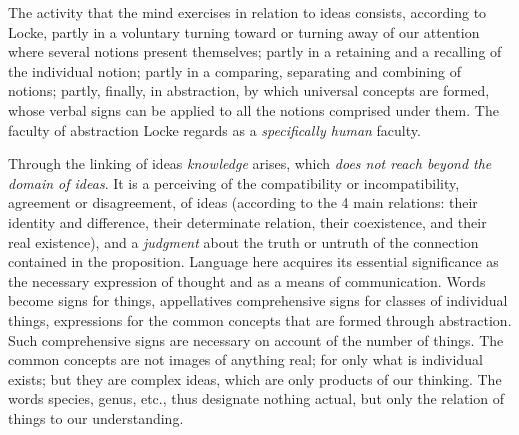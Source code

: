 The activity that the mind exercises in relation to ideas consists,
according to Locke, partly in a voluntary turning toward or turning away
of our attention where several notions present themselves; partly in a
retaining and a recalling of the individual notion; partly in a
comparing, separating and combining of notions; partly, finally, in
abstraction, by which universal concepts are formed, whose verbal signs
can be applied to all the notions comprised under them. The faculty of
abstraction Locke regards as a \emph{specifically human} faculty.

Through the linking of ideas \emph{knowledge} arises, which \emph{does
not reach beyond the domain of ideas}. It is a perceiving of the
compatibility or incompatibility, agreement or disagreement, of ideas
(according to the 4 main relations: their identity and difference,
their determinate relation, their coexistence, and their real
existence), and a \emph{judgment} about the truth or untruth of the
connection contained in the proposition. Language here acquires its
essential significance as the necessary expression of thought and as a
means of communication. Words become signs for things, appellatives
comprehensive signs for classes of individual things,
expressions for the common concepts that are formed through
abstraction. Such comprehensive signs are necessary on account of the
number of things. The common concepts are not images of anything real;
for only what is individual exists; but they are complex ideas, which
are only products of our thinking. The words species, genus, etc., thus
designate nothing actual, but only the relation of things to our
understanding.

